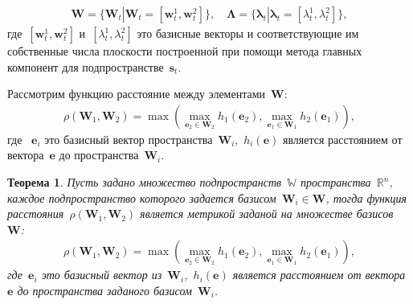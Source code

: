 \documentclass[12pt, twoside]{article}
\newtheorem{theorem}{Теорема}
\numberwithin{equation}{section}
\begin{document}
\begin{equation}
\label{eq:cl:3}
\begin{aligned}
\mathbf{W} = \{\textbf{W}_t| \textbf{W}_t = [\textbf{w}^1_t, \textbf{w}^2_t]\}, \quad \bm{\Lambda} = \{\bm{\lambda}_t| \bm{\lambda}_t=[\lambda^1_t, \lambda^2_t]\},
\end{aligned}
\end{equation}
где~$[\textbf{w}^1_t, \textbf{w}^2_t]$ и~$[\lambda^1_t, \lambda^2_t]$ это базисные векторы и соответствующие им собственные числа плоскости построенной при помощи метода главных компонент для подпространстве~$\textbf{s}_t$.

Рассмотрим функцию расстояние между элементами~$\mathbf{W}$:
\begin{equation}
\label{eq:cl:4}
\begin{aligned}
\rho\left(\textbf{W}_1, \textbf{W}_2\right) = \max\left(\max_{\textbf{e}_2 \in \textbf{W}_2} h_{1}\left(\textbf{e}_2\right), \max_{\textbf{e}_1 \in \textbf{W}_1} h_{2}\left(\textbf{e}_1\right)\right),
\end{aligned}
\end{equation}
где ~$\textbf{e}_i$ это базисный вектор пространства~$\textbf{W}_i$,~$h_i\left(\textbf{e}\right)$ является расстоянием от вектора~$\textbf{e}$ до пространства~$\textbf{W}_i$.

\begin{theorem}
Пусть задано множество подпространств~$\mathbb{W}$ пространства~$\mathbb{R}^{n}$, каждое подпространство которого задается базисом~$\mathbf{W}_i\in \mathbf{W}$, тогда функция расстояния~$\rho\left(\textbf{W}_1, \textbf{W}_2\right)$ является метрикой заданой на множестве базисов~$\mathbf{W}$:
\begin{equation}
\begin{aligned}
\rho\left(\textbf{W}_1, \textbf{W}_2\right) = \max\left(\max_{\textbf{e}_2 \in \textbf{W}_2} h_{1}\left(\textbf{e}_2\right), \max_{\textbf{e}_1 \in \textbf{W}_1} h_{2}\left(\textbf{e}_1\right)\right),
\end{aligned}
\end{equation}
где~$\textbf{e}_i$ это базисный вектор из~$\textbf{W}_i$,~$h_i\left(\textbf{e}\right)$ является расстоянием от вектора~$\textbf{e}$ до пространства заданого базисом~$\textbf{W}_i$.
\end{theorem}
\end{document}
